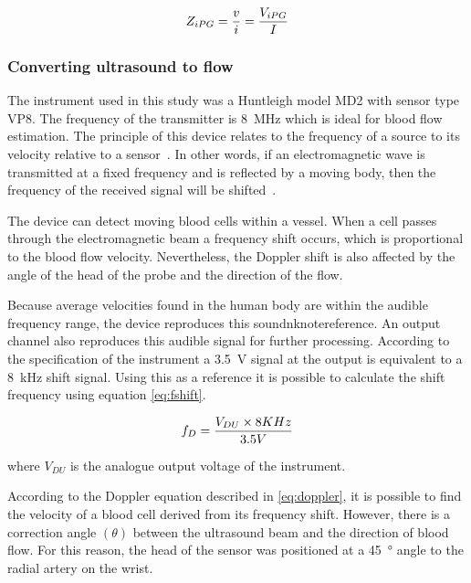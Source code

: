 \begin{align}
	\label{eq:zipg}
	Z_{iPG}=\frac{v}{i} = \frac{V_{iPG}}{I} \tagaddtext{[\si{\ohm}]}
\end{align}

\subsubsection{Converting ultrasound to flow}
\label{sectionDU}
The instrument used in this study was a Huntleigh model MD2 with sensor type VP8. The frequency of the transmitter is \SI{8}{\mega\hertz} which is ideal for blood flow estimation. The principle of this device relates to the frequency of a source to its velocity relative to a sensor~\cite{surgeonhand2002Hand}.  In other words, if an electromagnetic wave is transmitted at a fixed frequency and is reflected by a moving body, then the frequency of the received signal will be shifted~\cite{ht:MD2}.  

The device can detect moving blood cells within a vessel.  When a cell passes through the electromagnetic beam a frequency shift occurs, which is proportional to the blood flow velocity. Nevertheless, the Doppler shift is also affected by the angle of the head of the probe and the direction of the flow.

Because average velocities found in the human body are within the audible frequency range, the device reproduces this soundnknote{reference}. An output channel also reproduces this audible signal for further processing. According to the specification of the instrument a \SI{3.5}{\volt} signal at the output is equivalent to a \SI{8}{\kilo\hertz} shift signal. Using this as a reference it is possible to calculate the shift frequency using equation \ref{eq:fshift}.

\begin{align}
	\label{eq:fshift}
	f_D = \frac{V_{DU} \times 8 KHz}{3.5V} \tagaddtext{[\si{\hertz}]}
\end{align}  

where $V_{DU}$ is the analogue output voltage of the instrument. 

According to the Doppler equation described in \ref{eq:doppler}, it is possible to find the velocity of a blood cell derived from its frequency shift. However, there is a correction angle $(\theta)$ between the ultrasound beam and the direction of blood flow. For this reason, the head of the sensor was positioned at a \SI{45}{\degree} angle to the radial artery on the wrist.

